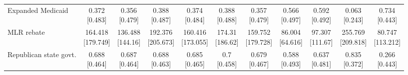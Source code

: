 \begin{tabular}[t]{lcccccccccc}
Expanded Medicaid & \makecell[t]{0.372\\{[}0.483{]}} & \makecell[t]{0.356\\{[}0.479{]}} & \makecell[t]{0.388\\{[}0.487{]}} & \makecell[t]{0.374\\{[}0.484{]}} & \makecell[t]{0.388\\{[}0.488{]}} & \makecell[t]{0.357\\{[}0.479{]}} & \makecell[t]{0.566\\{[}0.497{]}} & \makecell[t]{0.592\\{[}0.492{]}} & \makecell[t]{0.063\\{[}0.243{]}} & \makecell[t]{0.734\\{[}0.443{]}}\\
\addlinespace
MLR rebate & \makecell[t]{164.418\\{[}179.749{]}} & \makecell[t]{136.488\\{[}144.16{]}} & \makecell[t]{192.376\\{[}205.673{]}} & \makecell[t]{160.416\\{[}173.055{]}} & \makecell[t]{174.31\\{[}186.62{]}} & \makecell[t]{159.752\\{[}179.728{]}} & \makecell[t]{86.004\\{[}64.616{]}} & \makecell[t]{97.307\\{[}111.67{]}} & \makecell[t]{255.769\\{[}209.818{]}} & \makecell[t]{80.747\\{[}113.212{]}}\\
\addlinespace
Republican state govt. & \makecell[t]{0.688\\{[}0.464{]}} & \makecell[t]{0.687\\{[}0.464{]}} & \makecell[t]{0.688\\{[}0.463{]}} & \makecell[t]{0.685\\{[}0.465{]}} & \makecell[t]{0.7\\{[}0.458{]}} & \makecell[t]{0.679\\{[}0.467{]}} & \makecell[t]{0.588\\{[}0.493{]}} & \makecell[t]{0.637\\{[}0.481{]}} & \makecell[t]{0.835\\{[}0.372{]}} & \makecell[t]{0.266\\{[}0.443{]}}\\
\bottomrule
\end{tabular}

